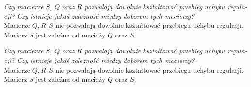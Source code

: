 \documentclass[12pt, letterpaper]{article}
\begin{document}
\begin{enumerate}



            \emph{Czy macierze $S$, $Q$ oraz $R$ pozwalają dowolnie kształtować przebieg uchybu regula-
            cji? Czy istnieje jakaś zależność między doborem tych macierzy?}\\
            Macierze $Q, R, S$ nie pozwalają dowolnie kształtować przebiegu uchybu regulacji.
            Macierz $S$ jest zależna od macieży $Q$ oraz $S$.



            \emph{Czy macierze $S$, $Q$ oraz $R$ pozwalają dowolnie kształtować przebieg uchybu regula-
            cji? Czy istnieje jakaś zależność między doborem tych macierzy?}\\
            Macierze $Q, R, S$ nie pozwalają dowolnie kształtować przebiegu uchybu regulacji.
            Macierz $S$ jest zależna od macieży $Q$ oraz $S$.
            
    \end{enumerate}
\end{document}
